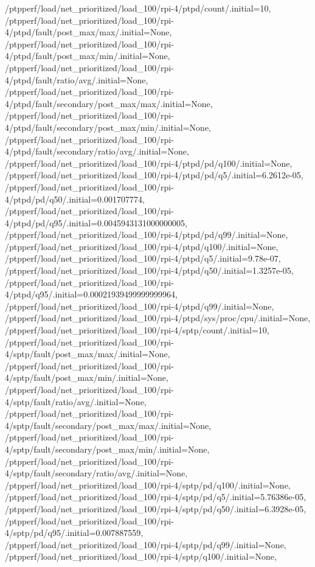 {    /ptpperf/load/net_prioritized/load_100/rpi-4/ptpd/count/.initial=10,
    /ptpperf/load/net_prioritized/load_100/rpi-4/ptpd/fault/post_max/max/.initial=None,
    /ptpperf/load/net_prioritized/load_100/rpi-4/ptpd/fault/post_max/min/.initial=None,
    /ptpperf/load/net_prioritized/load_100/rpi-4/ptpd/fault/ratio/avg/.initial=None,
    /ptpperf/load/net_prioritized/load_100/rpi-4/ptpd/fault/secondary/post_max/max/.initial=None,
    /ptpperf/load/net_prioritized/load_100/rpi-4/ptpd/fault/secondary/post_max/min/.initial=None,
    /ptpperf/load/net_prioritized/load_100/rpi-4/ptpd/fault/secondary/ratio/avg/.initial=None,
    /ptpperf/load/net_prioritized/load_100/rpi-4/ptpd/pd/q100/.initial=None,
    /ptpperf/load/net_prioritized/load_100/rpi-4/ptpd/pd/q5/.initial=6.2612e-05,
    /ptpperf/load/net_prioritized/load_100/rpi-4/ptpd/pd/q50/.initial=0.001707774,
    /ptpperf/load/net_prioritized/load_100/rpi-4/ptpd/pd/q95/.initial=0.0045943131000000005,
    /ptpperf/load/net_prioritized/load_100/rpi-4/ptpd/pd/q99/.initial=None,
    /ptpperf/load/net_prioritized/load_100/rpi-4/ptpd/q100/.initial=None,
    /ptpperf/load/net_prioritized/load_100/rpi-4/ptpd/q5/.initial=9.78e-07,
    /ptpperf/load/net_prioritized/load_100/rpi-4/ptpd/q50/.initial=1.3257e-05,
    /ptpperf/load/net_prioritized/load_100/rpi-4/ptpd/q95/.initial=0.00021939499999999964,
    /ptpperf/load/net_prioritized/load_100/rpi-4/ptpd/q99/.initial=None,
    /ptpperf/load/net_prioritized/load_100/rpi-4/ptpd/sys/proc/cpu/.initial=None,
    /ptpperf/load/net_prioritized/load_100/rpi-4/sptp/count/.initial=10,
    /ptpperf/load/net_prioritized/load_100/rpi-4/sptp/fault/post_max/max/.initial=None,
    /ptpperf/load/net_prioritized/load_100/rpi-4/sptp/fault/post_max/min/.initial=None,
    /ptpperf/load/net_prioritized/load_100/rpi-4/sptp/fault/ratio/avg/.initial=None,
    /ptpperf/load/net_prioritized/load_100/rpi-4/sptp/fault/secondary/post_max/max/.initial=None,
    /ptpperf/load/net_prioritized/load_100/rpi-4/sptp/fault/secondary/post_max/min/.initial=None,
    /ptpperf/load/net_prioritized/load_100/rpi-4/sptp/fault/secondary/ratio/avg/.initial=None,
    /ptpperf/load/net_prioritized/load_100/rpi-4/sptp/pd/q100/.initial=None,
    /ptpperf/load/net_prioritized/load_100/rpi-4/sptp/pd/q5/.initial=5.76386e-05,
    /ptpperf/load/net_prioritized/load_100/rpi-4/sptp/pd/q50/.initial=6.3928e-05,
    /ptpperf/load/net_prioritized/load_100/rpi-4/sptp/pd/q95/.initial=0.007887559,
    /ptpperf/load/net_prioritized/load_100/rpi-4/sptp/pd/q99/.initial=None,
    /ptpperf/load/net_prioritized/load_100/rpi-4/sptp/q100/.initial=None,
}
